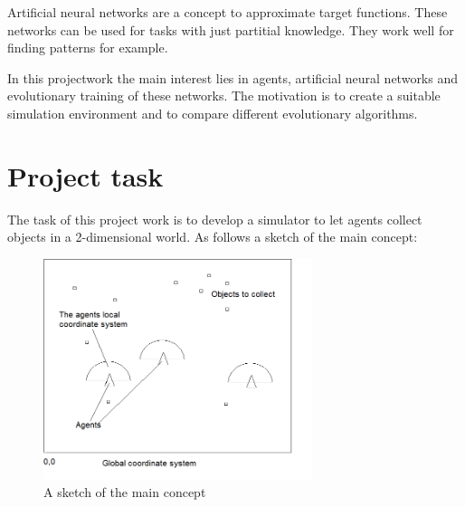 \documentclass[10pt,a4paper,DIV=11]{scrreprt}
\begin{document}
Artificial neural networks are a concept to approximate target functions. These networks can be used for tasks with just partitial knowledge.
They work well for finding patterns for example.

In this projectwork the main interest lies in agents, artificial neural networks and evolutionary training of these networks.
The motivation is to create a suitable simulation environment and to compare different evolutionary algorithms.







\section{Project task}
The task of this project work is to develop a simulator to let agents collect objects in a 2-dimensional world. As follows a sketch of the main concept: \\

\begin{center}
	\begin{figure}[H]
		\centering
		\includegraphics[width=0.7\textwidth,scale=1.0]{files/main-concept.png}  
		\caption{A sketch of the main concept}
		\label{fig:concept-main-intro}
	\end{figure}
\end{center}
\end{document}

